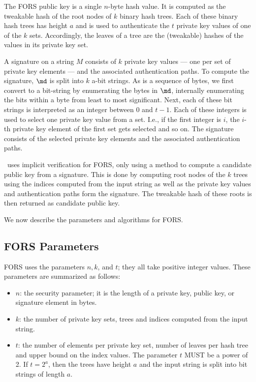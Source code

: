 The FORS public key is a single $n$-byte hash value. It is computed as the tweakable hash of the root nodes of $k$ binary hash trees. Each of these binary hash trees has height $a$ and is used to authenticate the $t$ private key values of one of the $k$ sets. Accordingly, the leaves of a tree are the (tweakable) hashes of the values in its private key set.

A signature on a string $M$ consists of $k$ private key values --- one per set of private key elements --- and the associated authentication paths. To compute the signature, $\md$ is split into $k$ a-bit strings. As \md is a sequence of bytes, we first convert to a bit-string by enumerating the bytes in $\md$, internally enumerating the bits within a byte from least to most significant. Next, each of these bit strings is interpreted as an integer between $0$ and $t-1$. Each of these integers is used to select one private key value from a set. I.e., if the first integer is $i$, the $i$-th private key element of the first set gets selected and so on. The signature consists of the selected private key elements and the associated authentication paths.

\SPHINCSA\ uses implicit verification for FORS, only using a method to compute a candidate public key from a signature. This is done by computing root nodes of the $k$ trees using the indices computed from the input string as well as the private key values and authentication paths form the signature. The tweakable hash of these roots is then returned as candidate public key.

We now describe the parameters and algorithms for FORS.

\subsection{FORS Parameters}
\label{sec:forspara}
FORS uses the parameters $n, k$, and $t$; they all take positive integer values. These parameters are summarized as follows:

\begin{itemize}
    \item $ n$: the security parameter; it is the length of a private key, public key, or signature element in bytes.

    \item $ k$: the number of private key sets, trees and indices computed from the input string.
    
    \item $ t$: the number of elements per private key set, number of leaves per hash tree and upper bound on the index values. The parameter $t$ MUST be a power of 2. If $t=2^{a}$, then the trees have height $a$ and the input string is split into bit strings of length $a.$
\end{itemize}


